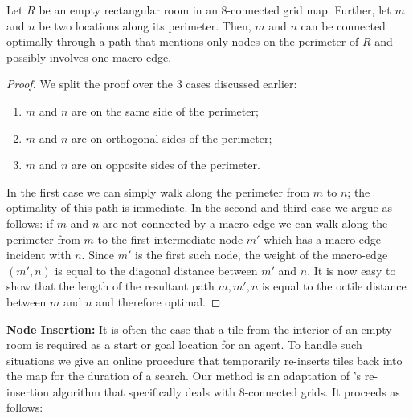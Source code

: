 \begin{lemma}
\label{lemma-rooms}
Let $R$ be an empty rectangular room in an 8-connected grid map.
Further, let $m$ and $n$ be two locations along its perimeter.
Then, $m$ and $n$ can be connected optimally through a path that mentions only nodes on the perimeter of $R$ and
possibly involves one macro edge.
\end{lemma}

\begin{proof}
We split the proof over the 3 cases discussed earlier:
\begin{enumerate}
\item{$m$ and $n$ are on the same side of the perimeter;}
\item{$m$ and $n$ are on orthogonal sides of the perimeter;}
\item{\label{lemma-rooms-step3} $m$ and $n$ are on opposite sides of the perimeter.}
\end{enumerate}
In the first case we can simply walk along the perimeter from $m$ to $n$; the optimality of this path is immediate. 
In the second and third case we argue as follows: if $m$ and $n$ are not connected by a macro edge
we can walk along the perimeter from $m$ to the first intermediate node $m'$
which has a macro-edge incident with $n$. 
Since $m'$ is the first such node, the weight of the macro-edge $(m', n)$ is equal to
the diagonal distance between $m'$ and $n$. 
It is now easy to show that the length of the resultant path ${m, m', n}$ is equal to the octile distance between 
$m$ and $n$ and therefore optimal.
\end{proof}

\noindent
\textbf{Node Insertion:}
It is often the case that a tile from the interior of an empty room is required as a start or goal location for an
agent. 
To handle such situations we give an online procedure that temporarily re-inserts tiles back into the map for the duration
of a search. 
Our method is an adaptation of \citeauthor{harabor10}'s re-insertion algorithm
that specifically deals with 8-connected grids.
It proceeds as follows:

